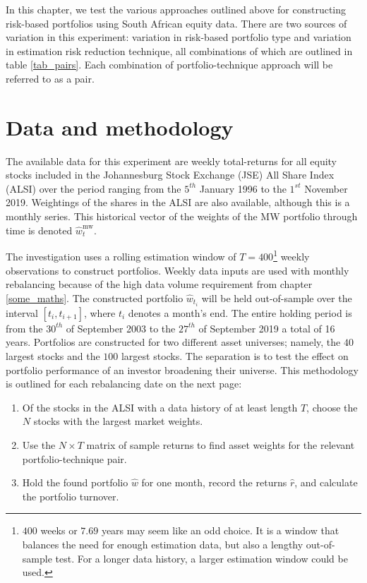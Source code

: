 \documentclass[a4paper,11pt,nocenter,bold,noupper,headcount]{mythesis}
\theoremstyle{plain}
\theoremstyle{definition}
\begin{document}
In this chapter, we test the various approaches outlined above for constructing risk-based portfolios using South African equity data. There are two sources of variation in this experiment: variation in risk-based portfolio type and variation in estimation risk reduction technique, all combinations of which are outlined in table \ref{tab_pairs}. Each combination of portfolio-technique approach will be referred to as a pair.

\section{Data and methodology}

The available data for this experiment are weekly total-returns for all equity stocks included in the Johannesburg Stock Exchange (JSE) All Share Index (ALSI) over the period ranging from the $5^{th}$ January 1996 to the $1^{st}$ November 2019. Weightings of the shares in the ALSI are also available, although this is a monthly series. This historical vector of the weights of the MW portfolio through time is denoted $\hat{w}^{\text{mw}}_t$.

The investigation uses a rolling estimation window of $T = 400$\footnote{$400$ weeks or $7.69$ years may seem like an odd choice. It is a window that balances the need for enough estimation data, but also a lengthy out-of-sample test. For a longer data history, a larger estimation window could be used.} weekly observations to construct portfolios. Weekly data inputs are used with monthly rebalancing because of the high data volume requirement from chapter \ref{some_maths}. The constructed portfolio $\hat{w}_{t_i}$ will be held out-of-sample over the interval $[t_i, t_{i + 1}]$, where $t_i$ denotes a month's end. The entire holding period is from the $30^{th}$ of September 2003 to the $27^{th}$ of September 2019 a total of 16 years. Portfolios are constructed for two different asset universes; namely, the $40$ largest stocks and the $100$ largest stocks. The separation is to test the effect on portfolio performance of an investor broadening their universe. This methodology is outlined for each rebalancing date on the next page: 
\begin{enumerate}
\item Of the stocks in the ALSI with a data history of at least length $T$,  choose the $N$ stocks with the largest market weights.
\item Use the $N  \times T$ matrix of sample returns to find asset weights for the relevant portfolio-technique pair.
\item Hold the found portfolio $\hat{w}$ for one month, record the returns $\hat{r}$, and calculate the portfolio turnover.
\end{enumerate}
\end{document}

